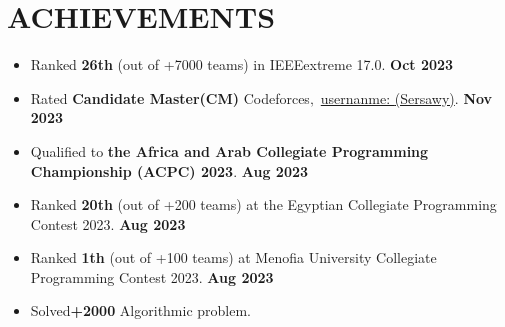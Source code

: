 \documentclass[letterpaper,11pt]{article}
\makeatletter
\newcommand{\resumeProjectHeading}[2]{
    \item
    \begin{tabular*}{1.001\textwidth}{l@{\extracolsep{\fill}}r}
      \small#1 & \textbf{\small #2}\\
    \end{tabular*}\vspace{-7pt}
}
\makeatother
\begin{document}
\section{ACHIEVEMENTS}
     \vspace{-2pt}
        \begin{itemize}
            \item {Ranked \textbf{26th} (out of +7000 teams) in IEEEextreme 17.0.} {\hspace{194pt} \textbf{Oct 2023}}
            \vspace{-23pt}
            \item {Rated \textbf{ Candidate Master(CM)} Codeforces$, $ \emph{} {{\href{https://codeforces.com/profile/Sersawy}{usernanme:\color{blue} {(Sersawy)}}}}. {\hspace{131pt} \textbf{Nov 2023}}}
            \vspace{-23pt}
            \item {Qualified to \textbf{the Africa and Arab Collegiate Programming Championship (ACPC) 2023}.} {\hspace{-7.3pt} \textbf{Aug 2023}}
            \vspace{-23pt}
            \item {Ranked \textbf{20th} (out of +200 teams) at the Egyptian Collegiate Programming Contest 2023.} {\hspace{35.7pt} \textbf{Aug 2023}}
            \vspace{-23pt}
            \item {Ranked \textbf{1th} (out of +100 teams) at Menofia University Collegiate Programming Contest 2023.} {\hspace{13.7pt} \textbf{Aug 2023}}
            \vspace{-23pt}
             \item {Solved\textbf{+2000} Algorithmic problem.}
            \vspace{0pt}
        \end{itemize}
    \vspace{-8pt}       
 

      
\end{document}
